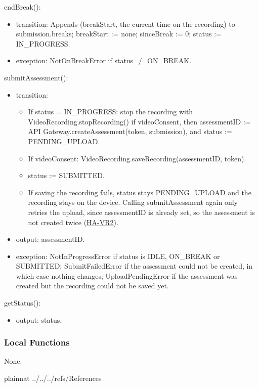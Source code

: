 \documentclass[12pt, titlepage]{article}
\newcommand{\hazref}[1]{\href{https://github.com/Nour-Fawaz/MacaBoca/blob/main/pdfs/HazardAnalysis/HazardAnalysis.pdf}{#1}}
\begin{document}
\noindent endBreak():
\begin{itemize}
\item transition: Appends (breakStart, the current time on the recording) to submission.breaks; breakStart := none; sinceBreak := 0; status := IN\_PROGRESS.
\item exception: NotOnBreakError if status $\neq$ ON\_BREAK.
\end{itemize}

\noindent submitAssessment():
\begin{itemize}
\item transition:
  \begin{itemize}
  \item If status = IN\_PROGRESS: stop the recording with VideoRecording.stopRecording() if videoConsent, then assessmentID := API Gateway.createAssessment(token, submission), and status := PENDING\_UPLOAD.
  \item If videoConsent: VideoRecording.saveRecording(assessmentID, token).
  \item status := SUBMITTED.
  \item If saving the recording fails, status stays PENDING\_UPLOAD and the recording stays on the device. Calling submitAssessment again only retries the upload, since assessmentID is already set, so the assessment is not created twice (\hazref{HA-VR2}).
  \end{itemize}
\item output: assessmentID.
\item exception: NotInProgressError if status is IDLE, ON\_BREAK or SUBMITTED; SubmitFailedError if the assessment could not be created, in which case nothing changes; UploadPendingError if the assessment was created but the recording could not be saved yet.
\end{itemize}

\noindent getStatus():
\begin{itemize}
\item output: status.
\end{itemize}

\subsubsection{Local Functions}
None.

\newpage

 {plainnat}
 {../../../refs/References}

\newpage
\end{document}
